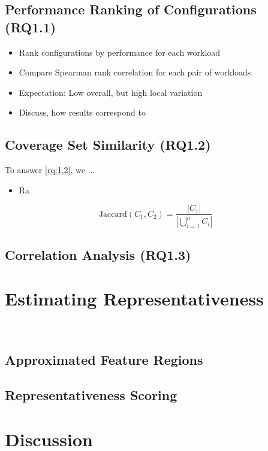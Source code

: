 \subsection{Performance Ranking of Configurations (RQ1.1)}
{\color{teal}
\begin{itemize}
	\item Rank configurations by performance for each workload
	\item Compare Spearman rank correlation for each pair of workloads
	\item Expectation: Low overall, but high local variation
	\item Discuss, how results correspond to~\cite{jamishidi_transfer_2017}
\end{itemize}
}

\subsection{Coverage Set Similarity (RQ1.2)}
To answer \ref{rq:1.2}, we ... 
{\color{teal}
	\begin{itemize}
		\item Ra
	\end{itemize}
}

\begin{equation}
	\text{Jaccard}(C_1, C_2) = \frac{|C_1|}{|\bigcup_{i=1}^{n} C_i|}
\end{equation}

\subsection{Correlation Analysis (RQ1.3)}


\section{Estimating Representativeness}~\label{sec:metric}

\subsection{Approximated Feature Regions}

\subsection{Representativeness Scoring}

\section{Discussion}

